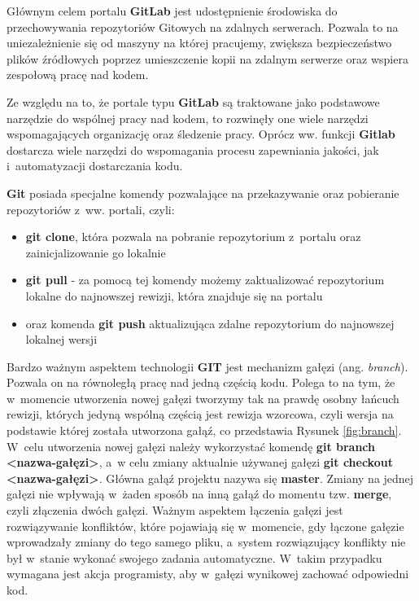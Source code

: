 Głównym celem portalu \textbf{GitLab} jest udostępnienie środowiska do przechowywania repozytoriów Gitowych na zdalnych serwerach. Pozwala to na uniezależnienie się od maszyny na której pracujemy, zwiększa bezpieczeństwo plików źródłowych poprzez umieszczenie kopii na zdalnym serwerze oraz wspiera zespołową pracę nad kodem.\par

Ze względu na to, że portale typu \textbf{GitLab} są traktowane jako podstawowe narzędzie do wspólnej pracy nad kodem, to rozwinęły one wiele narzędzi wspomagających organizację oraz śledzenie pracy. Oprócz ww. funkcji \textbf{Gitlab} dostarcza wiele narzędzi do wspomagania procesu zapewniania jakości, jak i~automatyzacji dostarczania kodu.\par

\textbf{Git} posiada specjalne komendy pozwalające na przekazywanie oraz pobieranie repozytoriów z~ww. portali, czyli:
\begin{itemize}
\item \textbf{git clone}, która pozwala na pobranie repozytorium z~portalu oraz zainicjalizowanie go lokalnie
\item \textbf{git pull} - za pomocą tej komendy możemy zaktualizować repozytorium lokalne do najnowszej rewizji, która znajduje się na portalu
\item oraz komenda \textbf{git push} aktualizująca zdalne repozytorium do najnowszej lokalnej wersji
\end{itemize}

Bardzo ważnym aspektem technologii \textbf{GIT} jest mechanizm gałęzi (ang. \textit{branch}). Pozwala on na równoległą pracę nad jedną częścią kodu. Polega to na tym, że w~momencie utworzenia nowej gałęzi tworzymy tak na prawdę osobny łańcuch rewizji, których jedyną wspólną częścią jest rewizja wzorcowa, czyli wersja na podstawie której została utworzona gałąź, co przedstawia Rysunek \ref{fig:branch}. W~celu utworzenia nowej gałęzi należy wykorzystać komendę \textbf{git branch <nazwa-gałęzi>}, a~w celu zmiany aktualnie używanej gałęzi \textbf{git checkout <nazwa-gałęzi>}. Główna gałąź projektu nazywa się \textbf{master}. Zmiany na jednej gałęzi nie wpływają w~żaden sposób na inną gałąź do momentu tzw. \textbf{merge}, czyli złączenia dwóch gałęzi. Ważnym aspektem łączenia gałęzi jest rozwiązywanie konfliktów, które pojawiają się w~momencie, gdy łączone gałęzie wprowadzały zmiany do tego samego pliku, a~system rozwiązujący konflikty nie był w~stanie wykonać swojego zadania automatyczne. W~takim przypadku wymagana jest akcja programisty, aby w~gałęzi wynikowej zachować odpowiedni kod.

